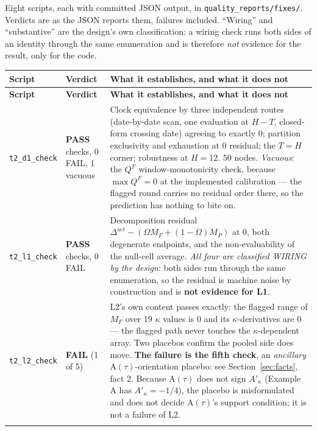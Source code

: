 \documentclass[11pt,a4paper]{article}
\newcommand{\Dact}{\Delta^{\mathrm{act}}}
\newcommand{\Atau}{\mathrm{A}(\tau)}
\newcommand{\Akap}{A'_{\kappa}}
\begin{document}
Eight scripts, each with committed JSON output, in
\texttt{quality\_reports/fixes/}. Verdicts are as the JSON reports them, failures
included. ``Wiring'' and ``substantive'' are the design's own classification: a
wiring check runs both sides of an identity through the same enumeration and is
therefore \emph{not} evidence for the result, only for the code.

\begingroup
\small
\setlength{\extrarowheight}{2pt}
\begin{longtable}{@{}>{\raggedright\arraybackslash}p{}>{\raggedright\arraybackslash}p{}>{\raggedright\arraybackslash}p{}@{}}
\toprule
\textbf{Script} & \textbf{Verdict} & \textbf{What it establishes, and what it does not}\\
\midrule
\endfirsthead
\toprule
\textbf{Script} & \textbf{Verdict} & \textbf{What it establishes, and what it does not}\\
\midrule
\endhead
\bottomrule
\endfoot

\texttt{t2\_d1\_check} & \textbf{PASS} \newline 9 checks, 0 FAIL, 1 vacuous &
Clock equivalence by three independent routes (date-by-date scan, one evaluation at
$H-T$, closed-form crossing date) agreeing to exactly $0$; partition exclusivity and
exhaustion at $0$ residual; the $T=H$ corner; robustness at $H=12$. 50 nodes.
\emph{Vacuous}: the $Q^F$ window-monotonicity check, because $\max Q^F=0$ at the
implemented calibration --- the flagged round carries no residual order there, so the
prediction has nothing to bite on. \\
\addlinespace

\texttt{t2\_l1\_check} & \textbf{PASS} \newline 4 checks, 0 FAIL &
Decomposition residual $\Dact-(\Omega M_F+(1-\Omega)M_P)$ at $0$, both degenerate
endpoints, and the non-evaluability of the null-cell average. \emph{All four are
classified WIRING by the design}: both sides run through the same enumeration, so the
residual is machine noise by construction and is \textbf{not evidence for L1}. \\
\addlinespace

\texttt{t2\_l2\_check} & \textbf{FAIL} (1 of 5) &
L2's own content passes exactly: the flagged range of $M_F$ over 19 $\kappa$ values
is $0$ and its $\kappa$-derivatives are $0$ --- the flagged path never touches the
$\kappa$-dependent array. Two placebos confirm the pooled side does move.
\textbf{The failure is the fifth check}, an \emph{ancillary} $\Atau$-orientation
placebo: see Section~\ref{sec:facts}, fact 2. Because $\Atau$ does not sign $\Akap$ (Example A has
$\Akap=-1/4$), the placebo is misformulated and does not decide $\Atau$'s support
condition; it is not a failure of L2. \\
\addlinespace


\end{longtable}
\end{document}
